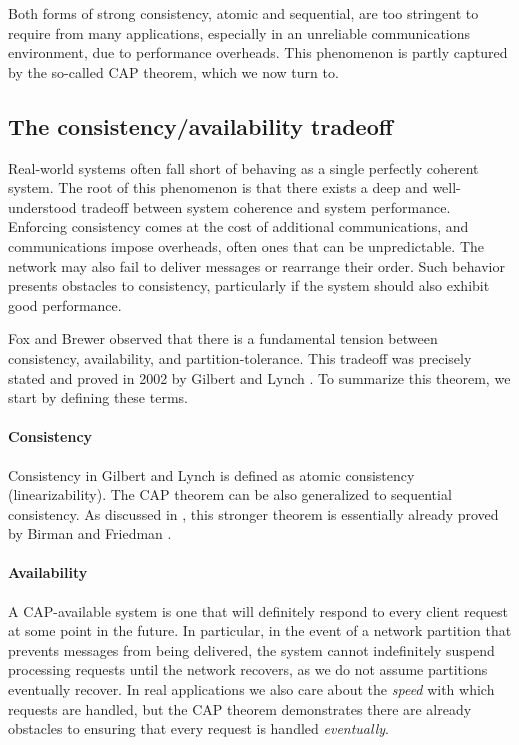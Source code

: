 Both forms of strong consistency, atomic and sequential, are too
stringent to require from many applications, especially in an
unreliable communications environment, due to performance overheads.
This phenomenon is partly captured by the so-called CAP theorem, which
we now turn to.

\subsection{The consistency/availability tradeoff}

Real-world systems often fall short of behaving as a single perfectly
coherent system. The root of this phenomenon is that there exists a
deep and well-understood tradeoff between system coherence and system
performance. Enforcing consistency comes at the cost of additional
communications, and communications impose overheads, often ones that
can be unpredictable. The network may also fail to deliver messages or
rearrange their order. Such behavior presents obstacles to
consistency, particularly if the system should also exhibit good
performance.

Fox and Brewer \cite{1999foxbrewer} observed that there is a
fundamental tension between consistency, availability, and
partition-tolerance. This tradeoff was precisely stated and proved in
2002 by Gilbert and Lynch \cite{2002gilbertlynchCAP}. To summarize
this theorem, we start by defining these terms.

\paragraph{Consistency}

Consistency in Gilbert and Lynch is defined as atomic consistency
(linearizability). The CAP theorem can be also generalized to
sequential consistency. As discussed in \cite{2019wideningcap}, this
stronger theorem is essentially already proved by Birman and Friedman
\cite{10.5555/866855}.

\paragraph{Availability}

A CAP-available system is one that will definitely respond to every
client request at some point in the future. In particular, in the
event of a network partition that prevents messages from being
delivered, the system cannot indefinitely suspend processing requests
until the network recovers, as we do not assume partitions eventually
recover. In real applications we also care about the \emph{speed} with
which requests are handled, but the CAP theorem demonstrates there are
already obstacles to ensuring that every request is handled
\emph{eventually}.

